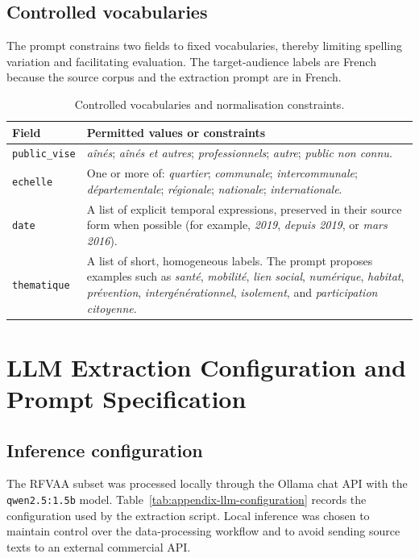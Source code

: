 \documentclass[
11pt,
english,
singlespacing,
headsepline,
]{MastersDoctoralThesis}
\begin{document}
\section{Controlled vocabularies}

The prompt constrains two fields to fixed vocabularies, thereby limiting
spelling variation and facilitating evaluation. The target-audience labels are
French because the source corpus and the extraction prompt are in French.

\begin{table}[H]
\centering
\begin{tabular}{p{3.6cm}p{10cm}}
\toprule
Field & Permitted values or constraints \\
\midrule
\texttt{public\_vise} & \textit{aînés}; \textit{aînés et autres}; \textit{professionnels}; \textit{autre}; \textit{public non connu}. \\
\texttt{echelle} & One or more of: \textit{quartier}; \textit{communale}; \textit{intercommunale}; \textit{départementale}; \textit{régionale}; \textit{nationale}; \textit{internationale}. \\
\texttt{date} & A list of explicit temporal expressions, preserved in their source form when possible (for example, \textit{2019}, \textit{depuis 2019}, or \textit{mars 2016}). \\
\texttt{thematique} & A list of short, homogeneous labels. The prompt proposes examples such as \textit{santé}, \textit{mobilité}, \textit{lien social}, \textit{numérique}, \textit{habitat}, \textit{prévention}, \textit{intergénérationnel}, \textit{isolement}, and \textit{participation citoyenne}. \\
\bottomrule
\end{tabular}
\caption{Controlled vocabularies and normalisation constraints.}
\label{tab:appendix-vocabularies}
\end{table}

\chapter{LLM Extraction Configuration and Prompt Specification}

\section{Inference configuration}

The RFVAA subset was processed locally through the Ollama chat API with the
\texttt{qwen2.5:1.5b} model. Table~\ref{tab:appendix-llm-configuration}
records the configuration used by the extraction script. Local inference was
chosen to maintain control over the data-processing workflow and to avoid
sending source texts to an external commercial API.
\end{document}
